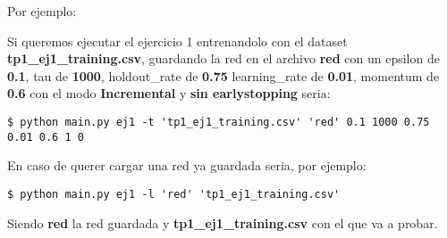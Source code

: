 Por ejemplo: 

Si queremos ejecutar el ejercicio 1 entrenandolo con el dataset \textbf{tp1\_ej1\_training.csv}, guardando la red en el archivo 
\textbf{red} con un epsilon de \textbf{0.1}, tau de \textbf{1000}, holdout\_rate de \textbf{0.75} learning\_rate de \textbf{0.01}, momentum de \textbf{0.6} con el modo \textbf{Incremental} y \textbf{sin earlystopping} seria:

\begin{verbatim}
$ python main.py ej1 -t 'tp1_ej1_training.csv' 'red' 0.1 1000 0.75  0.01 0.6 1 0 
\end{verbatim}

En caso de querer cargar una red ya guardada seria, por ejemplo:

\begin{verbatim}
$ python main.py ej1 -l 'red' 'tp1_ej1_training.csv'
\end{verbatim}

Siendo \textbf{red} la red guardada y \textbf{tp1\_ej1\_training.csv} con el que va a probar.